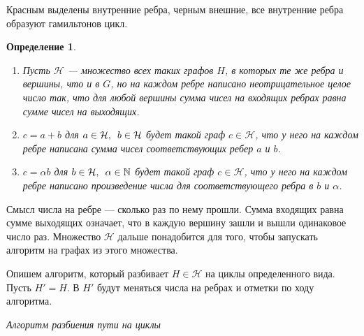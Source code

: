 \documentclass{article}
\newcommand{\squad}{
    \hspace{0.5em}
}
\newtheorem{definition}{Определение}
\begin{document}
\FloatBarrier

Красным выделены внутренние ребра, черным внешние, все внутренние ребра образуют гамильтонов цикл.

\begin{definition} $ $
    \begin{enumerate}
        \item Пусть $\mathcal{H}$ --- множество всех таких графов $H$, в которых те же ребра и вершины, что и в $G$, но на каждом ребре написано неотрицательное целое число так, что для любой вершины сумма чисел на входящих ребрах равна сумме чисел на выходящих.
        \item $c = a + b$ для $a \in \mathcal{H}, \squad b \in \mathcal{H}$ будет такой граф $c \in \mathcal{H}$, что у него на каждом ребре написана сумма чисел соответствующих ребер $a$ и $b$.
        \item $c = \alpha b$ для $b \in \mathcal{H}, \squad \alpha \in \mathbb{N}$ будет такой граф $c \in \mathcal{H}$, что у него на каждом ребре написано произведение числа для соответствующего ребра в $b$ и $\alpha$.
    \end{enumerate} 
\end{definition}

Смысл числа на ребре --- сколько раз по нему прошли. Сумма входящих равна сумме выходящих означает, что в каждую вершину зашли и вышли одинаковое число раз.
Множество $\mathcal{H}$ дальше понадобится для того, чтобы запускать алгоритм на графах из этого множества.


Опишем алгоритм, который разбивает $H \in \mathcal{H}$ на циклы определенного вида.
Пусть $H' = H$. В $H'$ будут меняться числа на ребрах и отметки по ходу алгоритма.
\begin{center}
    \textit{Алгоритм разбиения пути на циклы}
\end{center}

\begin{center}
\end{center}
\end{document}
